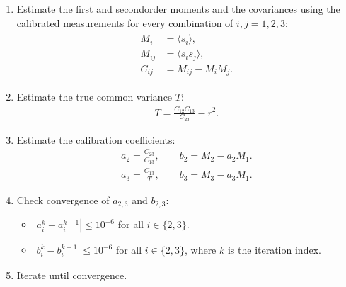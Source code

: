 \documentclass[a4paper,10pt,english]{sphinxmanual}
\begin{document}
\begin{enumerate}
\item {} 
\sphinxAtStartPar
Estimate the first\sphinxhyphen{} and second\sphinxhyphen{}order moments and the covariances using the
calibrated measurements for every combination of \(i,j=1,2,3\):
\begin{equation}\label{equation:alg-02-validation:eq-cvtdd-tc-moments}
\begin{split}\begin{aligned}
M_i &= \langle s_i\rangle, \\
M_{ij} &= \langle s_i s_j\rangle, \\
C_{ij} &= M_{ij}-M_iM_j .
\end{aligned}\end{split}
\end{equation}
\item {} 
\sphinxAtStartPar
Estimate the true common variance \(T\):
\begin{equation}\label{equation:alg-02-validation:eq-cvtdd-tc-true-variance}
\begin{split}T=\frac{C_{12}C_{13}}{C_{23}}-r^2 .\end{split}
\end{equation}
\item {} 
\sphinxAtStartPar
Estimate the calibration coefficients:
\begin{equation*}
\begin{split}a_2=\frac{C_{23}}{C_{13}},
\qquad b_2=M_2-a_2M_1 .\end{split}
\end{equation*}\begin{equation*}
\begin{split}a_3=\frac{C_{13}}{T},
\qquad b_3=M_3-a_3M_1 .\end{split}
\end{equation*}
\item {} 
\sphinxAtStartPar
Check convergence of \(a_{2,3}\) and \(b_{2,3}\):
\begin{itemize}
\item {} 
\sphinxAtStartPar
\(\left|a_i^k-a_i^{k-1}\right|\leq10^{-6}\)
for all \(i\in\{2,3\}\).

\item {} 
\sphinxAtStartPar
\(\left|b_i^k-b_i^{k-1}\right|\leq10^{-6}\)
for all \(i\in\{2,3\}\), where \(k\) is the iteration index.

\end{itemize}

\item {} 
\sphinxAtStartPar
Iterate until convergence.


\end{enumerate}
\end{document}

